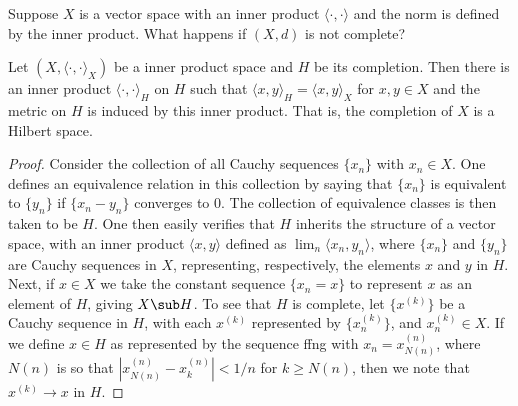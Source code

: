 Suppose $X$ is a vector space with an inner product $\langle\cdot,\cdot\rangle$ and the norm is defined by the inner product. What happens if $(X,d)$ is not complete?
\begin{proposition}
Let $(X,\langle\cdot,\cdot\rangle_X)$ be a inner product space and $H$ be its completion. Then there is an inner product $\langle\cdot,\cdot\rangle_H$ on $H$ such that $\langle x,y\rangle_H=\langle x,y\rangle_X$ for $x,y\in X$ and the metric on $H$ is induced by this inner product. That is, the completion of $X$ is a Hilbert space.
\end{proposition}
\begin{proof}
Consider the collection of all Cauchy sequences $\{x_n\}$ with $x_n\in X$. One defines an equivalence relation in this collection by saying that $\{x_n\}$ is equivalent to $\{y_n\}$ if $\{x_n-y_n\}$ converges to $0$. The collection of equivalence classes is then taken to be $H$. One then easily verifies that $H$ inherits the structure of a vector space, with an inner product $\langle x,y\rangle$ defined as $\lim_n\langle x_n,y_n\rangle$, where $\{x_n\}$ and $\{y_n\}$ are Cauchy sequences in $X$, representing, respectively, the elements $x$ and $y$ in $H$. Next, if $x\in X$ we take the constant sequence $\{x_n=x\}$ to represent $x$ as an element of $H$, giving $X\sub H$. To see that $H$ is complete, let $\{x^{(k)}\}$ be a Cauchy sequence in $H$, with each $x^{(k)}$ represented by $\{x^{(k)}_n\}$, and $x^{(k)}_n\in X$. If we define $x\in H$ as represented by the sequence ffng with $x_n=x^{(n)}_{N(n)}$, where $N(n)$ is so that $|x_{N(n)}^{(n)}-x^{(n)}_k|<1/n$ for $k\geq N(n)$, then we note that $x^{(k)}\to x$ in $H$.
\end{proof}
